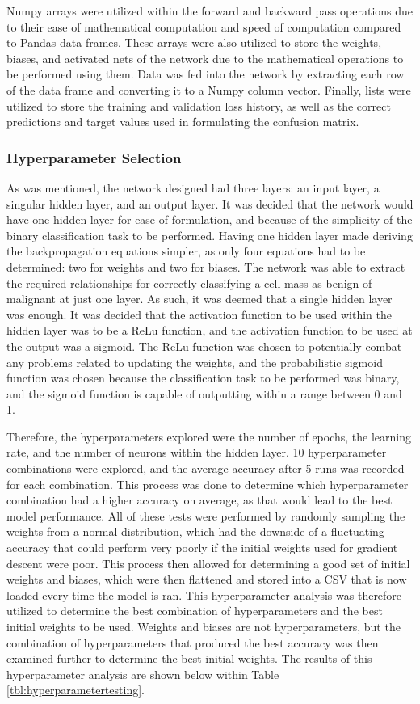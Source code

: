 \documentclass[a4paper]{article}
\begin{document}
Numpy arrays were utilized within the forward and backward pass operations due to their ease of mathematical computation and speed of computation compared to Pandas data frames. These arrays were also utilized to store the weights, biases, and activated nets of the network due to the mathematical operations to be performed using them. Data was fed into the network by extracting each row of the data frame and converting it to a Numpy column vector. Finally, lists were utilized to store the training and validation loss history, as well as the correct predictions and target values used in formulating the confusion matrix.

\subsubsection{Hyperparameter Selection}\label{ANNhyperparameterselection}

As was mentioned, the network designed had three layers: an input layer, a singular hidden layer, and an output layer. It was decided that the network would have one hidden layer for ease of formulation, and because of the simplicity of the binary classification task to be performed. Having one hidden layer made deriving the backpropagation equations simpler, as only four equations had to be determined: two for weights and two for biases. The network was able to extract the required relationships for correctly classifying a cell mass as benign of malignant at just one layer. As such, it was deemed that a single hidden layer was enough. It was decided that the activation function to be used within the hidden layer was to be a ReLu function, and the activation function to be used at the output was a sigmoid. The ReLu function was chosen to potentially combat any problems related to updating the weights, and the probabilistic sigmoid function was chosen because the classification task to be performed was binary, and the sigmoid function is capable of outputting within a range between 0 and 1. 

Therefore, the hyperparameters explored were the number of epochs, the learning rate, and the number of neurons within the hidden layer. 10 hyperparameter combinations were explored, and the average accuracy after 5 runs was recorded for each combination. This process was done to determine which hyperparameter combination had a higher accuracy on average, as that would lead to the best model performance. All of these tests were performed by randomly sampling the weights from a normal distribution, which had the downside of a fluctuating accuracy that could perform very poorly if the initial weights used for gradient descent were poor. This process then allowed for determining a good set of initial weights and biases, which were then flattened and stored into a CSV that is now loaded every time the model is ran. This hyperparameter analysis was therefore utilized to determine the best combination of hyperparameters and the best initial weights to be used. Weights and biases are not hyperparameters, but the combination of hyperparameters that produced the best accuracy was then examined further to determine the best initial weights. The results of this hyperparameter analysis are shown below within Table \ref{tbl:hyperparametertesting}.
\newpage
\end{document}
